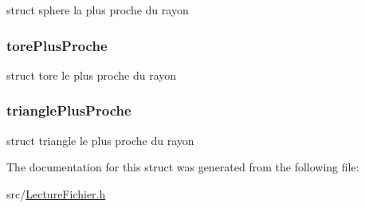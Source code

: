 \label{structobjet_plus_proche_ac6f2cdffe1ceb2e5dc9906cc9fa5c22c}
struct sphere la plus proche du rayon \hypertarget{structobjet_plus_proche_a76825c18c7b4ffdfeab81f867ff1267e}{
\subsubsection[{torePlusProche}]{ {\bf torePlusProche}}}
\label{structobjet_plus_proche_a76825c18c7b4ffdfeab81f867ff1267e}
struct tore le plus proche du rayon \hypertarget{structobjet_plus_proche_a41e5fb34eca76ab29fb646b4bfbd25ef}{
\subsubsection[{trianglePlusProche}]{ {\bf trianglePlusProche}}}
\label{structobjet_plus_proche_a41e5fb34eca76ab29fb646b4bfbd25ef}
struct triangle le plus proche du rayon 

The documentation for this struct was generated from the following file:\begin{DoxyCompactItemize}
\item 
src/\hyperlink{_lecture_fichier_8h}{LectureFichier.h}\end{DoxyCompactItemize}
